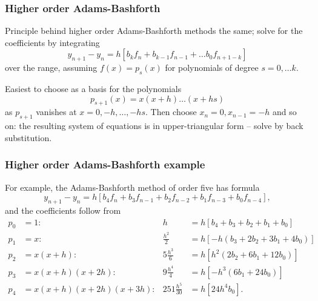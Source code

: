 \documentclass{beamer}
\begin{document}
\begin{frame}
  \frametitle{Higher order Adams-Bashforth}

  Principle behind higher order Adams-Bashforth methods the same;
  solve for the coefficients by integrating
  \begin{equation*}
    y_{n+1} - y_n = h \left[ b_k f_n + b_{k-1} f_{n-1} + \dots b_0
      f_{n + 1 - k} \right]
  \end{equation*}
  over the range, assuming $f(x) = p_s(x)$ for polynomials of degree
  $s = 0, \dots k$. \pause

  \vspace{1ex}

  Easiest to choose as a basis for the polynomials
  \begin{equation*}
    p_{s+1}(x) = x (x + h) \dots (x + h s)
  \end{equation*}
  as $p_{s+1}$ vanishes at $x = 0, -h, \dots, -h s$. \pause Then choose
  $x_n = 0, x_{n - 1} = -h$ and so on: the resulting system of
  equations is in upper-triangular form -- solve by back substitution.

\end{frame}

\begin{frame}
  \frametitle{Higher order Adams-Bashforth example}

  For example, the Adams-Bashforth method of order five has formula
  \begin{equation*}
    y_{n+1} - y_n = h \left[ b_4 f_n + b_3 f_{n-1} + b_2 f_{n-2} + b_1
      f_{n-3} + b_0 f_{n-4} \right] ,
  \end{equation*} \pause
  and the coefficients follow from
  {\small
  \begin{align*}
    p_0 & = 1: & h & = h \left[ b_4 + b_3 + b_2 + b_1 + b_0 \right] \\
    p_1 & = x: & \frac{h^2}{2} & = h \left[ -h \left( b_3 + 2 b_2 + 3
        b_1 + 4 b_0 \right) \right] \\
    p_2 & = x (x + h): & 5 \frac{h^3}{6} & = h \left[ h^2 \left( 2 b_2
        + 6 b_1 + 12 b_0 \right) \right] \\
    p_3 & = x (x + h) (x + 2 h): & 9 \frac{h^4}{4} & = h \left[ -h^3
      \left( 6 b_1 + 24 b_0 \right) \right] \\
    p_4 & = x (x + h) (x + 2 h) (x + 3 h): & 251 \frac{h^5}{30} & = h
    \left[ 24 h^4 b_0 \right].
  \end{align*}
  }
\end{frame}
\end{document}
